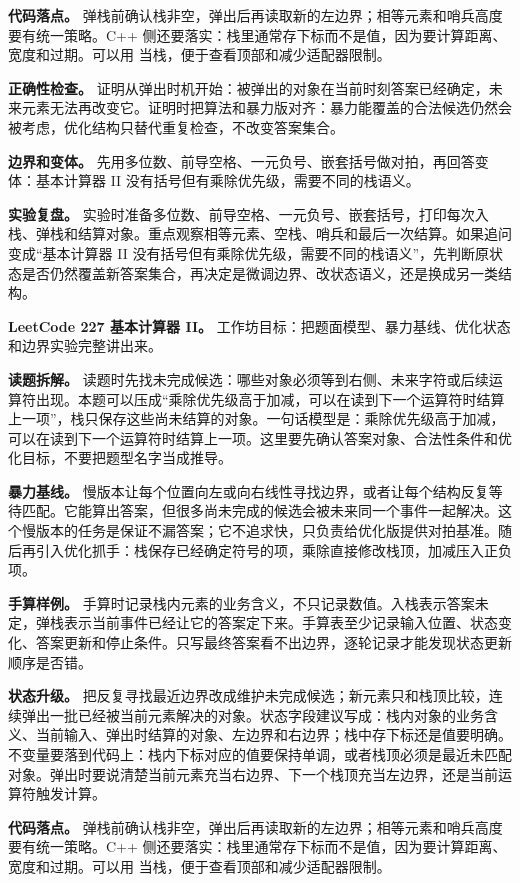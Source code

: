\textbf{代码落点。} 弹栈前确认栈非空，弹出后再读取新的左边界；相等元素和哨兵高度要有统一策略。C++ 侧还要落实：栈里通常存下标而不是值，因为要计算距离、宽度和过期。可以用  当栈，便于查看顶部和减少适配器限制。

\textbf{正确性检查。} 证明从弹出时机开始：被弹出的对象在当前时刻答案已经确定，未来元素无法再改变它。证明时把算法和暴力版对齐：暴力能覆盖的合法候选仍然会被考虑，优化结构只替代重复检查，不改变答案集合。

\textbf{边界和变体。} 先用多位数、前导空格、一元负号、嵌套括号做对拍，再回答变体：基本计算器 II 没有括号但有乘除优先级，需要不同的栈语义。

\textbf{实验复盘。} 实验时准备多位数、前导空格、一元负号、嵌套括号，打印每次入栈、弹栈和结算对象。重点观察相等元素、空栈、哨兵和最后一次结算。如果追问变成“基本计算器 II 没有括号但有乘除优先级，需要不同的栈语义”，先判断原状态是否仍然覆盖新答案集合，再决定是微调边界、改状态语义，还是换成另一类结构。

\noindent\textbf{LeetCode 227 基本计算器 II。} 工作坊目标：把题面模型、暴力基线、优化状态和边界实验完整讲出来。

\textbf{读题拆解。} 读题时先找未完成候选：哪些对象必须等到右侧、未来字符或后续运算符出现。本题可以压成“乘除优先级高于加减，可以在读到下一个运算符时结算上一项”，栈只保存这些尚未结算的对象。一句话模型是：乘除优先级高于加减，可以在读到下一个运算符时结算上一项。这里要先确认答案对象、合法性条件和优化目标，不要把题型名字当成推导。

\textbf{暴力基线。} 慢版本让每个位置向左或向右线性寻找边界，或者让每个结构反复等待匹配。它能算出答案，但很多尚未完成的候选会被未来同一个事件一起解决。这个慢版本的任务是保证不漏答案；它不追求快，只负责给优化版提供对拍基准。随后再引入优化抓手：栈保存已经确定符号的项，乘除直接修改栈顶，加减压入正负项。

\textbf{手算样例。} 手算时记录栈内元素的业务含义，不只记录数值。入栈表示答案未定，弹栈表示当前事件已经让它的答案定下来。手算表至少记录输入位置、状态变化、答案更新和停止条件。只写最终答案看不出边界，逐轮记录才能发现状态更新顺序是否错。

\textbf{状态升级。} 把反复寻找最近边界改成维护未完成候选；新元素只和栈顶比较，连续弹出一批已经被当前元素解决的对象。状态字段建议写成：栈内对象的业务含义、当前输入、弹出时结算的对象、左边界和右边界；栈中存下标还是值要明确。不变量要落到代码上：栈内下标对应的值要保持单调，或者栈顶必须是最近未匹配对象。弹出时要说清楚当前元素充当右边界、下一个栈顶充当左边界，还是当前运算符触发计算。

\textbf{代码落点。} 弹栈前确认栈非空，弹出后再读取新的左边界；相等元素和哨兵高度要有统一策略。C++ 侧还要落实：栈里通常存下标而不是值，因为要计算距离、宽度和过期。可以用  当栈，便于查看顶部和减少适配器限制。


